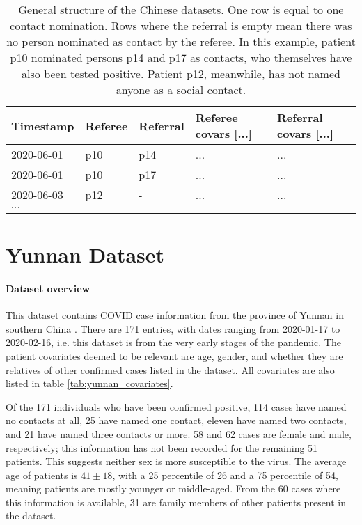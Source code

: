 \begin{table}
	\begin{tabularx}{\linewidth}{XXXXX}
		\hline
		\textbf{Timestamp} & \textbf{Referee} & \textbf{Referral} & \textbf{Referee covars [...]} & \textbf{Referral covars [...]} \\
		\hline
		2020-06-01 & p10 & p14 & ... & ... \\
		2020-06-01 & p10 & p17 & ... & ... \\
		2020-06-03 & p12 & - & ... & ... \\
		$\cdots$ & & & & \\
	\end{tabularx}
	\caption{General structure of the Chinese datasets. One row is equal to one contact nomination. Rows where the referral is empty mean there was no person nominated as contact by the referee. In this example, patient p10 nominated persons p14 and p17 as contacts, who themselves have also been tested positive. Patient p12, meanwhile, has not named anyone as a social contact.}
	\label{tab:china_data_structure}
\end{table}

\section{Yunnan Dataset}
\label{sec:yunnan_data}

\paragraph{Dataset overview} This dataset contains COVID case information from the province of Yunnan in southern China \cite{hainan_data}. There are 171 entries, with dates ranging from 2020-01-17 to 2020-02-16, i.e. this dataset is from the very early stages of the pandemic. The patient covariates deemed to be relevant are age, gender, and whether they are relatives of other confirmed cases listed in the dataset. All covariates are also listed in table \ref{tab:yunnan_covariates}.

Of the 171 individuals who have been confirmed positive, 114 cases have named no contacts at all, 25 have named one contact, eleven have named two contacts, and 21 have named three contacts or more. 58 and 62 cases are female and male, respectively; this information has not been recorded for the remaining 51 patients. This suggests neither sex is more susceptible to the virus. The average age of patients is $41\pm18$, with a 25 percentile of 26 and a 75 percentile of 54, meaning patients are mostly younger or middle-aged. From the 60 cases where this information is available, 31 are family members of other patients present in the dataset. 

